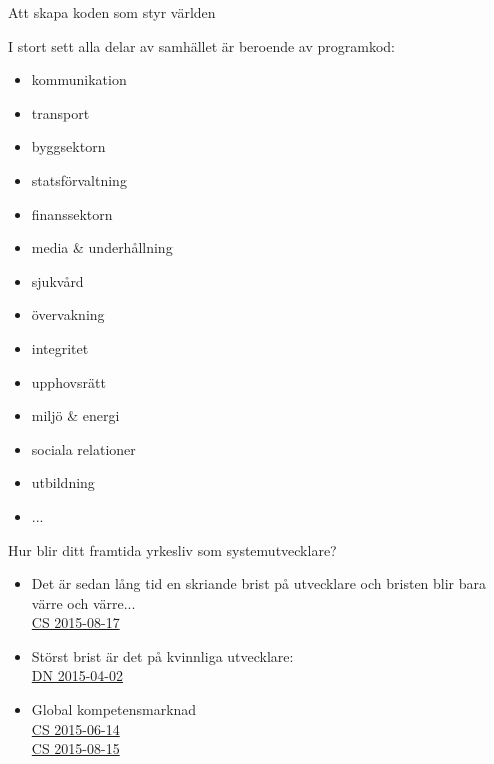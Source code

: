 \ifkompendium\else  %

\begin{Slide}{Att skapa koden som styr världen}
\begin{multicols}{2}\footnotesize
I stort sett alla delar av samhället är beroende av programkod:
\begin{itemize}\scriptsize
\item kommunikation
\item transport
\item byggsektorn
\item statsförvaltning
\item finanssektorn
\item media \& underhållning
\item sjukvård
\item övervakning
\item integritet
\item upphovsrätt
\item miljö \& energi
\item sociala relationer
\item utbildning 
\item ...
\end{itemize}
\columnbreak %
Hur blir ditt framtida yrkesliv som systemutvecklare?
\begin{itemize}
\item  Det är sedan lång tid en skriande brist på utvecklare och bristen blir bara värre och värre... \\
  \href{http://computersweden.idg.se/2.2683/1.634770/rekrytera-utvecklare}{CS 2015-08-17}
\item Störst brist är det på kvinnliga utvecklare: \\
\href{http://www.dn.se/ekonomi/it-branschen-hotas-av-brist-pa-kvinnor/}{DN 2015-04-02}
\item Global kompetensmarknad \\ 
  \href{http://computersweden.idg.se/2.2683/1.630901/det-finns-programmerare-och-sa-finns-det-programmerare}{CS 2015-06-14}\\
   \href{http://computersweden.idg.se/2.2683/1.634700/7-satt-att-bli-en-battre-programmerare}{CS 2015-08-15}
\end{itemize}
\end{multicols}
\end{Slide}

